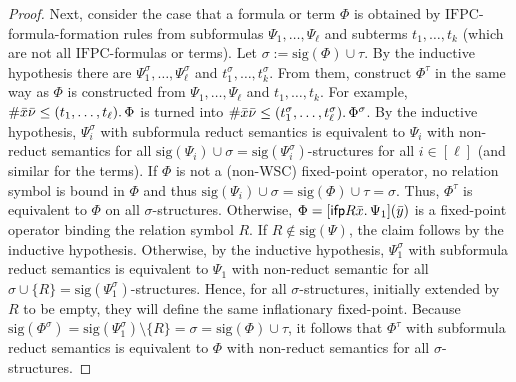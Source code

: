 \documentclass[]{lmcs}
\newcommand{\qspace}{\mathchoice{\;}{\,}{}{}}
\newcommand{\set}[1]{\lbrace #1 \rbrace}
\newcommand{\numVarA}{\nu}
\newcommand{\uniVarA}{x}
\newcommand{\varVec}[1]{\bar{#1}}
\newcommand{\numVarVA}{\varVec{\numVarA}}
\newcommand{\uniVarVA}{\varVec{\uniVarA}}
\newcommand{\termB}{t}
\newcommand{\formA}{\Phi}
\newcommand{\formB}{\Psi}
\newcommand{\rel}{R}
\newcommand{\tup}[1]{\bar{#1}}
\newcommand{\sig}{\tau}
\newcommand{\sigA}{\tau}
\newcommand{\sigB}{\sigma}
\newcommand{\sigOf}[1]{\mathrm{sig}(#1)}
\newcommand{\IFPC}{\ensuremath{\mathrm{IFPC}}}
\newcommand{\ifp}{\mathsf{ifp}}
\begin{document}
\begin{proof}
	Next, consider the case that a formula or term $\formA$ is obtained by \IFPC{}-formula-formation rules from subformulas $\formB_1,\dots, \formB_\ell$ and subterms $\termB_1, \dots, \termB_k$ (which are not all \IFPC{}-formulas or terms).
	Let $\sigB := \sigOf{\formA} \cup \sigA$.
	By the inductive hypothesis there are $\formB_1^\sigB, \dots, \formB_\ell^\sigB$ and $\termB_1^\sigB,\dots,\termB_k^\sigB$.
	From them, construct $\formA^\sig$ in the same way as $\formA$ is constructed from $\formB_1,\dots, \formB_\ell$ and $\termB_1, \dots, \termB_k$.
	For example, $\#\uniVarVA\numVarVA \leq (\termB_1,\dots,\termB_\ell).\qspace\formA$
	is turned into $ \#\uniVarVA\numVarVA \leq (\termB_1^\sigB,\dots, \termB_\ell^\sigB).\qspace\formA^\sigB$.
	By the inductive hypothesis, $\formB_i^\sigB$ with subformula reduct semantics
	is equivalent to $\formB_i$ with non-reduct semantics for all $\sigOf{\formB_i} \cup \sigB=\sigOf{\formB_i^\sigB} $-structures for all $i \in [\ell]$ (and similar for the terms).
	If $\formA$ is not a (non-WSC) fixed-point operator, no relation symbol is bound in $\formA$ and thus $\sigOf{\formB_i} \cup \sigB = \sigOf{\formA} \cup \sigA = \sigB$.
	Thus, $\formA^\tau$ is equivalent to $\formA$ on all $\sigB$-structures.
	Otherwise, $\formA = [\ifp \rel \tup{x}.\qspace \formB_1](\tup{y})$ is a fixed-point operator binding the relation symbol $\rel$.
	If $\rel \notin \sigOf{\formB}$, the claim follows by the inductive hypothesis.
	Otherwise, by the inductive hypothesis,
	$\formB_1^\sigB$ with subformula reduct semantics
	is equivalent to $\formB_1$ with non-reduct semantic
	for all $ \sigB \cup \set{\rel}=\sigOf{\formB_1^\sigB}$-structures.
	Hence, for all $\sigB$-structures, initially extended by $R$ to be empty,
	they will define the same inflationary fixed-point.
	Because $\sigOf{\formA^\sigB} = \sigOf{\formB_1^\sigB} \setminus \set{\rel} = \sigB = \sigOf{\formA} \cup \sigA$,
	it follows that $\formA^\sigA$  with subformula reduct semantics is equivalent to $\formA$ with non-reduct semantics for all $\sigB$-structures.
	

\end{proof}
\end{document}
